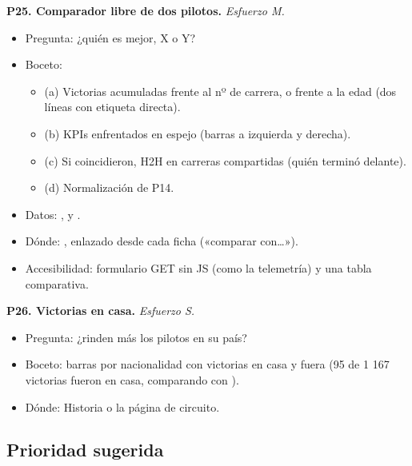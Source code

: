 \textbf{P25. Comparador libre de dos pilotos.} \emph{Esfuerzo M.}

\begin{itemize}
\item Pregunta: ¿quién es mejor, X o Y?
\item Boceto:
\begin{itemize}
\item (a) Victorias acumuladas frente al nº de carrera, o frente a la edad (dos líneas con etiqueta directa).
\item (b) KPIs enfrentados en espejo (barras a izquierda y derecha).
\item (c) Si coincidieron, H2H en carreras compartidas (quién terminó delante).
\item (d) Normalización de P14.
\end{itemize}
\item Datos: ,  y .
\item Dónde: , enlazado desde cada ficha («comparar con…»).
\item Accesibilidad: formulario GET sin JS (como la telemetría) y una tabla comparativa.
\end{itemize}

\textbf{P26. Victorias en casa.} \emph{Esfuerzo S.}

\begin{itemize}
\item Pregunta: ¿rinden más los pilotos en su país?
\item Boceto: barras por nacionalidad con victorias en casa y fuera (95 de 1 167 victorias fueron en casa, comparando  con ).
\item Dónde: Historia o la página de circuito.
\end{itemize}

\subsection{Prioridad sugerida}


